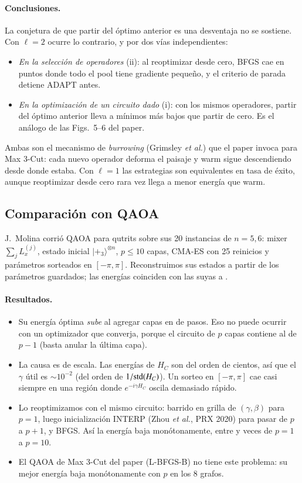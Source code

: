 \documentclass[11pt,a4paper]{article}
\renewcommand{\ket}[1]{|#1\rangle}
\begin{document}
\paragraph{Conclusiones.} La conjetura de que partir del óptimo anterior es una desventaja no se
sostiene. Con $\ell=2$ ocurre lo contrario, y por dos vías independientes:
\begin{itemize}
\item \emph{En la selección de operadores} (ii): al reoptimizar desde cero, BFGS cae en puntos
  donde todo el pool tiene gradiente pequeño, y el criterio de parada detiene ADAPT antes.
\item \emph{En la optimización de un circuito dado} (i): con los mismos operadores, partir del
  óptimo anterior lleva a mínimos más bajos que partir de cero. Es el análogo de las Figs.~5--6 del
  paper.
\end{itemize}
Ambas son el mecanismo de \emph{burrowing} (Grimsley \emph{et al.}) que el paper invoca para Max
3-Cut: cada nuevo operador deforma el paisaje y warm sigue descendiendo desde donde estaba. Con
$\ell=1$ las estrategias son equivalentes en tasa de éxito, aunque reoptimizar desde cero rara vez
llega a menor energía que warm.

\subsection{Comparación con QAOA}

J.~Molina corrió QAOA para qutrits sobre sus 20 instancias de $n=5,6$: mixer
$\sum_jL_x^{(j)}$, estado inicial $\ket{+_3}^{\otimes n}$, $p\leq10$ capas, CMA-ES con 25
reinicios y parámetros sorteados en $[-\pi,\pi]$. Reconstruimos sus estados a partir de los
parámetros guardados; las energías coinciden con las suyas a \QaoaDif.

\paragraph{Resultados.}
\begin{itemize}
\item Su energía óptima \emph{sube} al agregar capas en \QaoaSube{} de \QaoaPasos{} pasos. Eso no
  puede ocurrir con un optimizador que converja, porque el circuito de $p$ capas contiene al de
  $p-1$ (basta anular la última capa).
\item La causa es de escala. Las energías de $H_C$ son del orden de cientos, así que el $\gamma$
  útil es $\sim10^{-2}$ (del orden de $1/{\rm std}(H_C)$). Un sorteo en $[-\pi,\pi]$ cae casi
  siempre en una región donde $e^{-i\gamma H_C}$ oscila demasiado rápido.
\item Lo reoptimizamos con el mismo circuito: barrido en grilla de $(\gamma,\beta)$ para $p=1$,
  luego inicialización INTERP (Zhou \emph{et al.}, PRX 2020) para pasar de $p$ a $p+1$, y BFGS.
  Así la energía baja monótonamente, entre \QaoaBajaMin{} y \QaoaBajaMax{} veces de $p=1$ a
  $p=10$.
\item El QAOA de Max 3-Cut del paper (L-BFGS-B) no tiene este problema: su mejor energía baja
  monótonamente con $p$ en los 8 grafos.
\end{itemize}
\end{document}
